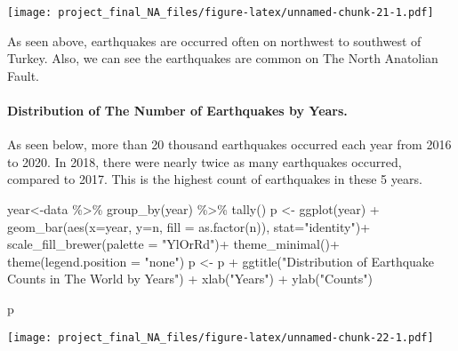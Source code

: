 \documentclass[
]{article}
\newenvironment{Shaded}{\begin{snugshade}}{\end{snugshade}}
\newcommand{\AttributeTok}[1]{\textcolor[rgb]{0.77,0.63,0.00}{#1}}
\newcommand{\FunctionTok}[1]{\textcolor[rgb]{0.00,0.00,0.00}{#1}}
\newcommand{\NormalTok}[1]{#1}
\newcommand{\OtherTok}[1]{\textcolor[rgb]{0.56,0.35,0.01}{#1}}
\newcommand{\SpecialCharTok}[1]{\textcolor[rgb]{0.00,0.00,0.00}{#1}}
\newcommand{\StringTok}[1]{\textcolor[rgb]{0.31,0.60,0.02}{#1}}
\begin{document}
\texttt{[image: project\_final\_NA\_files/figure-latex/unnamed-chunk-21-1.pdf]}

As seen above, earthquakes are occurred often on northwest to southwest
of Turkey. Also, we can see the earthquakes are common on The North
Anatolian Fault.

\hypertarget{distribution-of-the-number-of-earthquakes-by-years.}{%
\paragraph{Distribution of The Number of Earthquakes by
Years.}\label{distribution-of-the-number-of-earthquakes-by-years.}}

As seen below, more than 20 thousand earthquakes occurred each year from
2016 to 2020. In 2018, there were nearly twice as many earthquakes
occurred, compared to 2017. This is the highest count of earthquakes in
these 5 years.

\begin{Shaded}
\begin{Highlighting}[]
\NormalTok{year}\OtherTok{\textless{}{-}}\NormalTok{data }\SpecialCharTok{\%\textgreater{}\%} \FunctionTok{group\_by}\NormalTok{(year) }\SpecialCharTok{\%\textgreater{}\%} \FunctionTok{tally}\NormalTok{()}
\NormalTok{p }\OtherTok{\textless{}{-}} \FunctionTok{ggplot}\NormalTok{(year) }\SpecialCharTok{+} \FunctionTok{geom\_bar}\NormalTok{(}\FunctionTok{aes}\NormalTok{(}\AttributeTok{x=}\NormalTok{year, }\AttributeTok{y=}\NormalTok{n, }\AttributeTok{fill =} \FunctionTok{as.factor}\NormalTok{(n)), }\AttributeTok{stat=}\StringTok{"identity"}\NormalTok{)}\SpecialCharTok{+}
      \FunctionTok{scale\_fill\_brewer}\NormalTok{(}\AttributeTok{palette =} \StringTok{"YlOrRd"}\NormalTok{)}\SpecialCharTok{+}
      \FunctionTok{theme\_minimal}\NormalTok{()}\SpecialCharTok{+}
      \FunctionTok{theme}\NormalTok{(}\AttributeTok{legend.position =} \StringTok{"none"}\NormalTok{)}
\NormalTok{p }\OtherTok{\textless{}{-}}\NormalTok{ p }\SpecialCharTok{+} \FunctionTok{ggtitle}\NormalTok{(}\StringTok{"Distribution of Earthquake Counts in The World by Years"}\NormalTok{) }\SpecialCharTok{+}
      \FunctionTok{xlab}\NormalTok{(}\StringTok{"Years"}\NormalTok{) }\SpecialCharTok{+} \FunctionTok{ylab}\NormalTok{(}\StringTok{"Counts"}\NormalTok{)}

\NormalTok{p}
\end{Highlighting}
\end{Shaded}

\texttt{[image: project\_final\_NA\_files/figure-latex/unnamed-chunk-22-1.pdf]}
\end{document}
